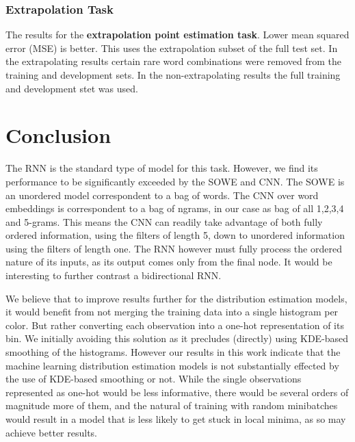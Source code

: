 \documentclass[11pt,a4paper]{article}
\begin{document}
\subsubsection{Extrapolation Task}
\begin{table}
	\caption{\label{tbl:pointextrapo} The results for the \textbf{extrapolation point estimation task}. Lower mean squared error (MSE) is better. This uses the extrapolation subset of the full test set. In the extrapolating results certain rare word combinations were removed from the training and development sets. In the non-extrapolating results the full training and development stet was used.}
\end{table}




\section{Conclusion}

The RNN is the standard type of model for this task.
However, we find its performance to be significantly exceeded by the SOWE and CNN.
The SOWE is an unordered model correspondent to a bag of words.
The CNN over word embeddings is correspondent to a bag of ngrams, in our case as bag of all 1,2,3,4 and 5-grams.
This means the CNN can readily take advantage of both fully ordered information, using the filters of length 5, down to unordered information using the filters of length one.
The RNN however must fully process the ordered nature of its inputs, as its output comes only from the final node.
It would be interesting to further contrast a bidirectional RNN.


We believe that to improve results further for the distribution estimation models,
it would benefit from not merging the training data into a single histogram per color.
But rather converting each observation into a one-hot representation of its bin.
We initially avoiding this solution as it precludes (directly) using KDE-based smoothing of the histograms.
However our results in this work indicate that the machine learning distribution estimation models is not substantially effected by the use of KDE-based smoothing or not.
While the single observations represented as one-hot would be less informative, there would be several orders of magnitude more of them, and the natural of training with random minibatches would result in a model that is less likely to get stuck in local minima, as so may achieve better results.


\clearpage


\clearpage
\appendix

\end{document}
